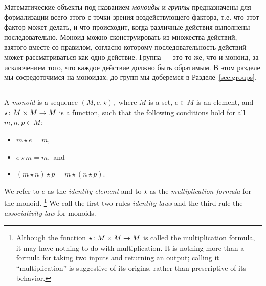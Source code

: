 \documentclass[CT4S-EN-RU]{subfiles}
\begin{document}
\begin{blockRUS}
Математические объекты под названием {\em моноиды} и {\em группы} предназначены для формализации всего этого с точки зрения воздействующего фактора, т.е. что этот фактор может делать, и что происходит, когда различные действия выполнены последовательно. Моноид можно сконструировать из множества действий, взятого вместе со правилом, согласно которому последовательность действий может рассматриваться как одно действие. Группа — это то же, что и моноид, за исключением того, что каждое действие должно быть обратимым. В этом разделе мы сосредоточимся на моноидах; до групп мы доберемся в Разделе~\ref{sec:groups}.
\end{blockRUS}


\subsection{}

\begin{definitionENG}[Monoid]\label{def:monoid}
A {\em monoid} is a sequence $(M,e,\star),$ where $M$ is a set, $e\in M$ is an element, and $\star\colon M\times M\rightarrow M$ is a function, such that the following conditions hold for all $m,n,p\in M$:
\begin{itemize}
\item $m\star e=m,$
\item $e\star m=m,$ and
\item $(m\star n)\star p=m\star(n\star p).$
\end{itemize}
We refer to $e$ as the {\em identity element} and to $\star$ as the {\em multiplication formula} for the monoid.%
\footnote{Although the function $\star\colon M\times M\rightarrow M$ is called the multiplication formula, it may have nothing to do with multiplication. It is nothing more than a formula for taking two inputs and returning an output; calling it “multiplication” is suggestive of its origins, rather than prescriptive of its behavior.}
We call the first two rules {\em identity laws} and the third rule the {\em associativity law} for monoids.
\end{definitionENG}
\end{document}
